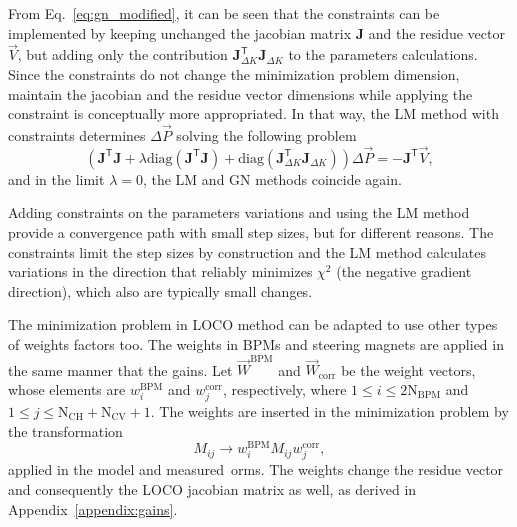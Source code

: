 From Eq.~\eqref{eq:gn_modified}, it can be seen that the constraints can be implemented by keeping unchanged the jacobian matrix $\mathbf{J}$ and the residue vector $\vec{V}$, but adding only the contribution $\mathbf{J}^{\mathsf{T}}_{\Delta K}\mathbf{J}_{\Delta K}$ to the parameters calculations. Since the constraints do not change the minimization problem dimension, maintain the jacobian and the residue vector dimensions while applying the constraint is conceptually more appropriated. In that way, the LM method with constraints determines $\Delta \vec{P}$ solving the following problem
\begin{equation}
\left(\mathbf{J}^{\mathsf{T}}\mathbf{J} + \lambda \mathrm{diag}\left(\mathbf{J}^{\mathsf{T}}\mathbf{J}\right) + \mathrm{diag}\left(\mathbf{J}^{\mathsf{T}}_{\Delta K}\mathbf{J}_{\Delta K}\right) \right)\Delta \vec{P} = - \mathbf{J}^{\mathsf{T}}\vec{V},
\label{eq:param_calc}
\end{equation}
and in the limit $\lambda = 0$, the LM and GN methods coincide again.

Adding constraints on the parameters variations and using the LM method provide a convergence path with small step sizes, but for different reasons. The constraints limit the step sizes by construction and the LM method calculates variations in the direction that reliably minimizes $\chi^2$ (the negative gradient direction), which also are typically small changes.

The minimization problem in LOCO method can be adapted to use other types of weights factors too. The weights in BPMs and steering magnets are applied in the same manner that the gains. Let $\vec{W}^{\mathrm{BPM}}$ and $\vec{W}_{\mathrm{corr}}$ be the weight vectors, whose elements are $w^{\mathrm{BPM}}_{i}$ and $w^{\mathrm{corr}}_{j}$, respectively, where $1 \leq i \leq 2\mathrm{N}_{\mathrm{BPM}}$ and $1 \leq j \leq \mathrm{N}_{\mathrm{CH}} + \mathrm{N}_{\mathrm{CV}} + 1$. The weights are inserted in the minimization problem by the transformation
\begin{equation}
    M_{ij} \rightarrow w^{\mathrm{BPM}}_{i}M_{ij}w^{\mathrm{corr}}_{j}, 
\end{equation}
applied in the model and measured~\gls{orm}s. The weights change the residue vector and consequently the LOCO jacobian matrix as well, as derived in Appendix~\ref{appendix:gains}. 



